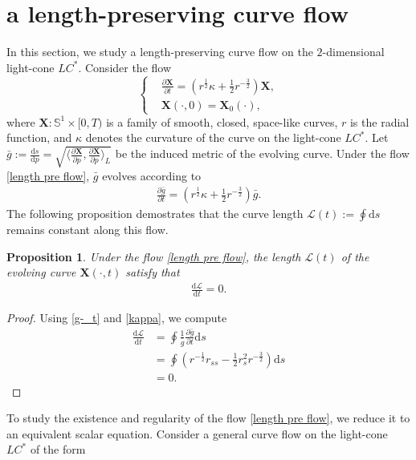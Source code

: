 \documentclass[reqno,11pt, letterpaper]{amsart}
\theoremstyle{plain}
\newtheorem{prop}[thm]{Proposition}
\theoremstyle{definition}
\def\d{\mathrm d}
\def\Bbb#1{{\mathbb#1}}
\def\S{\Bbb S}
\numberwithin{equation}{section}
\begin{document}
\section{a length-preserving curve flow}\label{sec-flow}
In this section, we study a length-preserving curve flow on the $2$-dimensional light-cone $LC^*$.
Consider the flow
\begin{equation}\label{length pre flow}
	\left\{
	\begin{aligned}
		&\frac{\partial\mathbf{X}}{\partial t}=\left(r^{\frac{1}{2}}\kappa+\frac{1}{2}r^{-\frac{3}{2}}\right)\mathbf{X},\\
		&\mathbf{X}(\cdot,0)=\mathbf{X}_0(\cdot),
	\end{aligned}
	\right.
\end{equation}
where $\mathbf{X}: \S^1\times[0,T)$ is a family of smooth, closed, space-like curves, $r$ is the  radial function, and $\kappa$ denotes the curvature of the curve on the light-cone $LC^*$. 
Let $\bar{g}:=\frac{\d s}{\d p}=\sqrt{\langle\frac{\partial\mathbf{X}}{\partial p},\frac{\partial\mathbf{X}}{\partial p}\rangle_L}$ be the induced metric of the evolving curve.  Under the flow \eqref{length pre flow}, $\bar{g}$ evolves according to
\begin{align}\label{g-_t}
	\frac{\partial\bar{g}}{\partial t}=\left(r^{\frac{1}{2}}\kappa+\frac{1}{2}r^{-\frac{3}{2}}\right)\bar{g}. 
\end{align}
The following proposition demostrates that the curve length $\mathcal{L}(t):=\oint\d s$ remains constant along this flow.
\begin{prop}\label{L}
	Under the flow \eqref{length pre flow}, the length $\mathcal{L}(t)$ of the evolving curve $\mathbf{X}(\cdot,t)$ satisfy that
	\begin{align*}
		\frac{\d\mathcal{L}}{\d t}=0.
	\end{align*}
\end{prop}
\begin{proof}
	Using \eqref{g-_t} and \eqref{kappa}, we compute
	\begin{align*}
		\frac{\d\mathcal{L}}{\d t}&=\oint\frac{1}{\bar{g}}\frac{\partial \bar{g}}{\partial t}\d s\\
		&=\oint\left(r^{-\frac{1}{2}}r_{ss}-\frac{1}{2}r_s^2r^{-\frac{3}{2}}\right)\d s\\
		&=0.
	\end{align*}
\end{proof}
To study the existence and regularity of the flow \eqref{length pre flow}, we reduce it to an equivalent scalar equation. Consider a general curve flow on the light-cone $LC^*$ of the form
\end{document}

